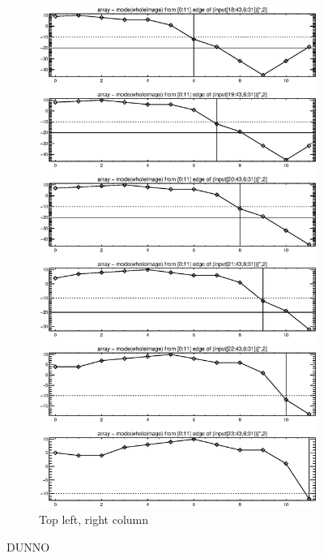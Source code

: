 \documentclass[10pt]{article}
\begin{document}
\begin{figure}[!h]
\begin{subfigure}[b]{.4\linewidth}
        \centering
        \includegraphics[width=1.4\textwidth]{plots_tables_images/topleft1.eps} 
        \caption{Top left, right column}
    \end{subfigure}
    \caption{DUNNO}
\end{figure}
\end{document}
